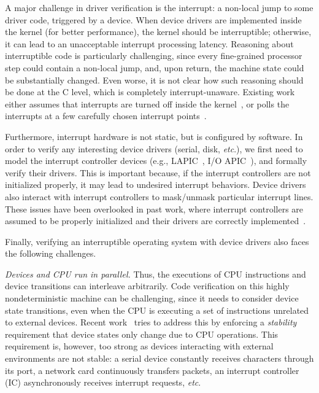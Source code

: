 A major challenge in driver verification is the interrupt: a non-local
jump to some driver code, triggered by a device. When device drivers
are implemented inside the kernel (for better performance), the kernel
should be interruptible; otherwise, it can lead to an unacceptable
interrupt processing latency.  Reasoning about interruptible code is
particularly challenging, since every fine-grained processor step
could contain a non-local jump, and, upon return, the machine state
could be substantially changed. Even worse, it is not clear how such
reasoning should be done at the C level, which is completely
interrupt-unaware. Existing work either assumes that interrupts are
turned off inside the kernel~\cite{dscal15,verisoft07}, or polls the
interrupts at a few carefully chosen interrupt points~\cite{klein14}.

Furthermore, interrupt hardware is not static, but is configured by
software. In order to verify any interesting device drivers (serial,
disk, {\it etc}.), we first need to model the interrupt controller
devices (e.g., LAPIC~\cite{mps97}, I/O APIC~\cite{ioapicd96}), and
formally verify their drivers. This is important because, if the
interrupt controllers are not initialized properly, it may lead to
undesired interrupt behaviors. Device drivers also interact with
interrupt controllers to mask/unmask particular interrupt lines.
These issues have been overlooked in past work, where 
interrupt controllers are assumed to be properly initialized and
their drivers are correctly implemented~\cite{Alkassar:VSTTE08-225}.

Finally, verifying an interruptible operating system with device
drivers also faces the following challenges.

{\em Devices and CPU run in parallel.} Thus, the executions of CPU
instructions and device transitions can interleave arbitrarily. Code
verification on this highly nondeterministic machine can be
challenging, since it needs to consider device state transitions, even
when the CPU is executing a set of instructions unrelated to external
devices. Recent
work~\cite{Alkassar:OSVE09,Alkassar:VSTTE08-225,Alkassar:VSTTE2010-71}
tries to address this by enforcing a {\it stability} requirement
that device states only change due to CPU operations. 
%
%
This requirement is, however, 
too strong as devices interacting with 
external environments are not stable: a serial device constantly
receives characters through its port, a network card continuously
transfers packets, an interrupt controller (IC) asynchronously
receives interrupt requests, {\it etc}.

